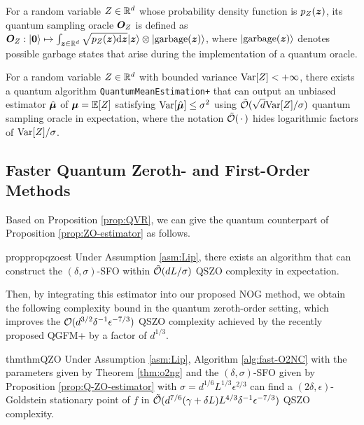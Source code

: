 	\begin{dfn} \label{dfn:quantum-sampling}
		For a random variable $Z \in {\mathbb{R}}^d$ whose probability density function is $p_Z({\bm{z}})$, its quantum sampling oracle ${\bm{O}}_Z$ is defined as ${\bm{O}}_Z: | {\bm{0}} \rangle \mapsto \int_{{\bm{z}} \in {\mathbb{R}}^d} \sqrt{ p_Z({\bm{z}}) {\rm d} {\bm{z}}} | {\bm{z}} \rangle  \otimes | {\rm garbage}({\bm{z}}) \rangle $, where $| {\rm garbage}({\bm{z}}) \rangle$ denotes possible garbage
		states that arise during the implementation of a quantum oracle.
	\end{dfn}


	\begin{prop} \label{prop:QVR}
		For a random variable $Z \in {\mathbb{R}}^d$ with bounded variance ${\rm Var}[Z]  < + \infty$, there exists a quantum algorithm \texttt{QuantumMeanEstimation+} that can output an unbiased estimator $\hat {{\bm{\mu}}}$ of ${\bm{\mu}} = \mathbb{E} [Z]$ satisfying ${\rm Var}[\hat {{\bm{\mu}}}] \le \sigma^2$ using $\tilde {{\mathcal{O}}}( \sqrt{d} {\rm Var}[Z] / \sigma)$ quantum sampling oracle in expectation, where the notation $\tilde {{\mathcal{O}}}(\,\cdot\,)$ hides logarithmic factors of ${\rm Var}[Z] / \sigma$.
	\end{prop}

	\subsection{Faster Quantum Zeroth- and First-Order Methods}

	Based on Proposition \ref{prop:QVR}, we can give the quantum counterpart of Proposition \ref{prop:ZO-estimator} as follows.

	\begin{restatable}{prop}{propqzoest}
		\label{prop:Q-ZO-estimator}
		Under Assumption \ref{asm:Lip},
		there exists an algorithm that can construct the $(\delta,\sigma)$-SFO within $\tilde {{\mathcal{O}}}( d L / \sigma )$ QSZO complexity in expectation.
	\end{restatable}
	Then, by integrating this estimator into our proposed NOG method, we obtain the following complexity bound in the quantum zeroth-order setting, which improves the ${\mathcal{O}}(d^{3/2} \delta^{-1} \epsilon^{-7/3})$ QSZO complexity achieved by the recently proposed QGFM+ \citep{liu2024quantum} by a factor of $d^{1/3}$.

	\begin{restatable}{thm}{thmQZO}
		\label{thm:QZO}
		Under Assumption \ref{asm:Lip}, Algorithm \ref{alg:fast-O2NC} with the parameters given by Theorem \ref{thm:o2ng} and the $(\delta,\sigma)$-SFO given by Proposition \ref{prop:Q-ZO-estimator} with $\sigma= d^{1/6} L^{1/3} \epsilon^{2/3}$ can find a $(2\delta,\epsilon)$-Goldstein stationary point of $f$ in $\tilde {{\mathcal{O}}}(d^{7/6}(\gamma + \delta L) L^{4/3} \delta^{-1} \epsilon^{-7/3})$ QSZO complexity.
	\end{restatable}

